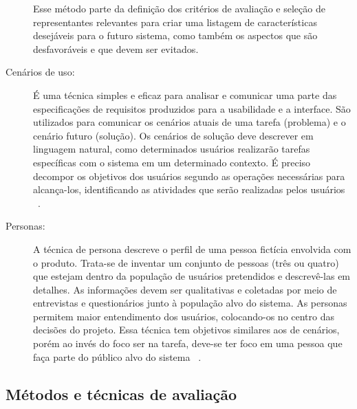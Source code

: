 \begin{description}
	Esse método parte da definição dos critérios de avaliação e seleção de representantes relevantes para criar uma listagem de características desejáveis para o futuro sistema, como também os aspectos que são desfavoráveis e que devem ser evitados.

\item[Cenários de uso:]

	É uma técnica simples e eficaz para analisar e comunicar uma parte das especificações de requisitos produzidos para a usabilidade e a interface. São utilizados para comunicar os cenários atuais de uma tarefa (problema) e o cenário futuro (solução). Os cenários de solução deve descrever em linguagem natural, como determinados usuários realizarão tarefas específicas com o sistema em um determinado contexto. É preciso decompor os objetivos dos usuários segundo as operações necessárias para alcança-los, identificando as atividades que serão realizadas pelos usuários ~\cite{cybis2010}.

\item[Personas:]

	A técnica de persona descreve o perfil de uma pessoa fictícia envolvida com o produto. Trata-se de inventar um conjunto de pessoas (três ou quatro) que estejam dentro da população de usuários pretendidos e descrevê-las em detalhes.
%
	As informações devem ser qualitativas e coletadas por meio de entrevistas e questionários junto à população alvo do sistema. As personas permitem maior entendimento dos usuários, colocando-os no centro das decisões do projeto. Essa técnica tem objetivos similares aos de cenários, porém ao invés do foco ser na tarefa, deve-se ter foco em uma pessoa que faça parte do público alvo do sistema ~\cite{cybis2010}.

\end{description}

\subsection{Métodos e técnicas de avaliação}
\label{avaliacao}

